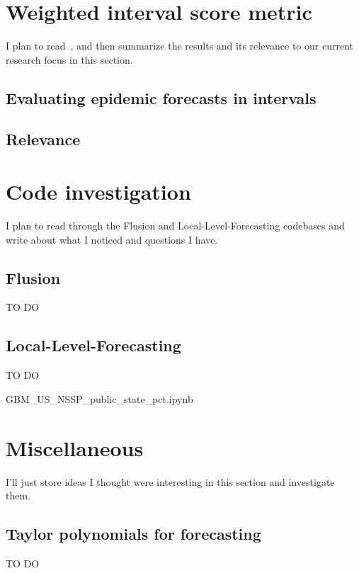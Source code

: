 \documentclass[12pt]{article}
\begin{document}
\section{Weighted interval score metric}
I plan to read~\cite{bracher21}, and then summarize the results and its relevance to our current research focus in this section.
\subsection{Evaluating epidemic forecasts in intervals}
\subsection{Relevance}

\section{Code investigation}
I plan to read through the Flusion and Local-Level-Forecasting codebases and write about what I noticed and questions I have.
\subsection{Flusion}
TO DO
\subsection{Local-Level-Forecasting}
TO DO

GBM\_US\_NSSP\_public\_state\_pct.ipynb

\section{Miscellaneous}
I'll just store ideas I thought were interesting in this section and investigate them.
\subsection{Taylor polynomials for forecasting}
TO DO


\printbibliography
\end{document}
